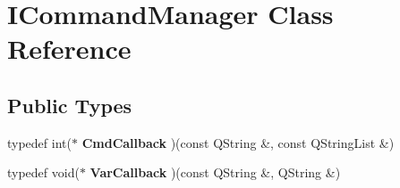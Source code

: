 \hypertarget{class_i_command_manager}{\section{I\-Command\-Manager Class Reference}
\label{class_i_command_manager}
}
\subsection*{Public Types}
\begin{DoxyCompactItemize}
\item 
\hypertarget{class_i_command_manager_aad93f45962c23c66dbb643b2a437a6b5}{typedef int($\ast$ {\bfseries Cmd\-Callback} )(const Q\-String \&, const Q\-String\-List \&)}\label{class_i_command_manager_aad93f45962c23c66dbb643b2a437a6b5}

\item 
\hypertarget{class_i_command_manager_a8ca7fae732c3682aa0d0120b81570eb4}{typedef void($\ast$ {\bfseries Var\-Callback} )(const Q\-String \&, Q\-String \&)}\label{class_i_command_manager_a8ca7fae732c3682aa0d0120b81570eb4}

\end{DoxyCompactItemize}
